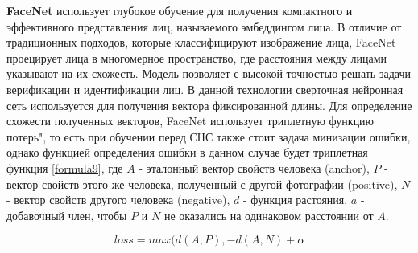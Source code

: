 \textbf{FaceNet} использует глубокое обучение для получения компактного и эффективного представления лиц, называемого эмбеддингом лица. В отличие от традиционных подходов, которые классифицируют изображение лица, FaceNet проецирует лица в многомерное пространство, где расстояния между лицами указывают на их схожесть. Модель позволяет с высокой точностью решать задачи верификации и идентификации лиц. В данной технологии сверточная нейронная сеть используется для получения вектора фиксированной длины. Для определение схожести полученных векторов, FaceNet использует триплетную функцию потерь", то есть при обучении перед СНС также стоит задача минизации ошибки, однако функцией определения ошибки в данном случае будет триплетная функция \ref{formula9}, где $A$ - эталонный вектор свойств человека (anchor), $P$ - вектор свойств этого же человека, полученный с другой фотографии (positive), $N$ - вектор свойств другого человека (negative), $d$ - функция растояния, $a$ - добавочный член, чтобы $P$ и $N$ не оказались на одинаковом расстоянии от $A$.

\begin{equation}
loss = max(d(A, P), - d(A, N) + \alpha
\label{formula9}
\end{equation}



\renewcommand\bibname{СПИСОК ИСПОЛЬЗОВАННЫХ ИСТОЧНИКОВ}






